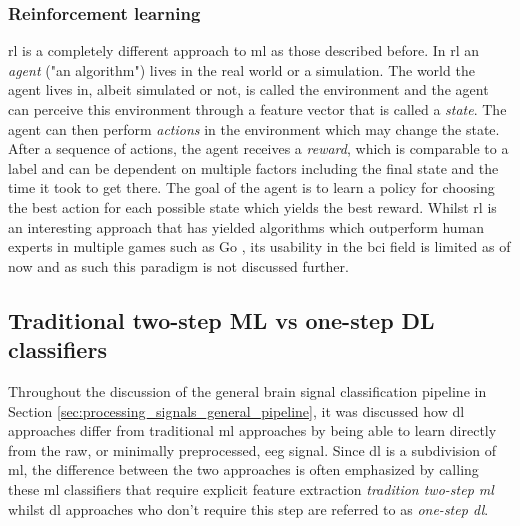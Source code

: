 
\subsubsection{Reinforcement learning}
\label{subsubsec:processing_signals_ml_and_dl_tyes_of_learning_supervision_rl}

\Gls{rl} is a completely different approach to \gls{ml} as those described before.
In \gls{rl} an \textit{agent} ("an algorithm") lives in the real world or a simulation.
The world the agent lives in, albeit simulated or not, is called the environment and the agent can perceive this environment through a feature vector that is called a \textit{state}.
The agent can then perform \textit{actions} in the environment which may change the state.
After a sequence of actions, the agent receives a \textit{reward}, which is comparable to a label and can be dependent on multiple factors including the final state and the time it took to get there.
The goal of the agent is to learn a policy for choosing the best action for each possible state which yields the best reward.
Whilst \gls{rl} is an interesting approach that has yielded algorithms which outperform human experts in multiple games such as Go \citep{alphago}, its usability in the \gls{bci} field is limited as of now and as such this paradigm is not discussed further.



\subsection{Traditional two-step ML vs one-step DL classifiers}
\label{subsec:processing_signals_ml_and_dl_difference}

Throughout the discussion of the general brain signal classification pipeline in Section \ref{sec:processing_signals_general_pipeline}, it was discussed how \gls{dl} approaches differ from traditional \gls{ml} approaches by being able to learn directly from the raw, or minimally preprocessed, \gls{eeg} signal.
Since \gls{dl} is a subdivision of \gls{ml}, the difference between the two approaches is often emphasized by calling these \gls{ml} classifiers that require explicit feature extraction \textit{tradition two-step \gls{ml}} whilst \gls{dl} approaches who don't require this step are referred to as \textit{one-step \gls{dl}}.

